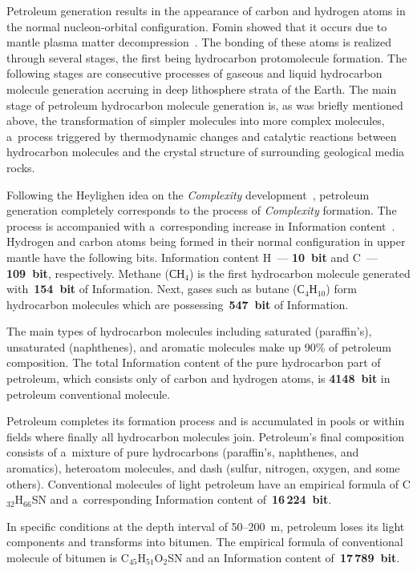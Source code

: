 \begin{multicols}{2}
Petroleum generation results in the appearance of carbon and hydrogen atoms in the normal 
nucleon-orbital configuration. Fomin showed that it occurs due to mantle plasma matter 
decompression~\cite{21-sel}. The bonding of these atoms is realized through several stages, the first 
being hydrocarbon protomolecule formation. The following stages are consecutive processes of 
gaseous and liquid hydrocarbon molecule generation accruing in deep lithosphere strata of the 
Earth. The main stage of petroleum hydrocarbon molecule generation is, as was briefly 
mentioned 
above, the transformation of simpler molecules into more complex molecules, a~process triggered 
by thermodynamic changes and catalytic reactions between hydrocarbon molecules and the 
crystal structure of surrounding geological media rocks. 

Following the Heylighen idea on the \textit{Complexity} development~\cite{7-sel}, petroleum generation 
completely corresponds to the process of \textit{Complexity}  formation. The process is 
accompanied with a~corresponding increase in Information content~\cite{22-sel}. Hydrogen and carbon 
atoms being formed in their normal configuration in upper mantle have the following bits. 
Information content H~--- \textbf{10~bit} and C~--- \textbf{109~bit}, 
respectively. Methane (СН$_4$) is 
the first hydrocarbon molecule generated with~\textbf{154~bit} of Information. Next, gases 
such as butane (С$_4$Н$_{10}$) form hydrocarbon molecules which are 
possessing~\textbf{547~bit} of Information.
 
The main types of hydrocarbon molecules including saturated (paraffin's), unsaturated 
(naphthenes), and aromatic molecules make up 90\% of petroleum composition. The total 
Information content of the pure hydrocarbon part of petroleum, which consists only of carbon 
and hydrogen atoms, is \textbf{4148~bit} in petroleum conventional molecule.

Petroleum completes its formation process and is accumulated in pools or within fields where 
finally all hydrocarbon molecules join. Petroleum's final composition consists of a~mixture of 
pure hydrocarbons (paraffin's, naphthenes, and aromatics), heteroatom molecules, and dash 
(sulfur, nitrogen, oxygen, and some others). Conventional molecules of light petroleum have an 
empirical formula of C$_{32}$H$_{66}$SN and a~corresponding Information content 
of~\textbf{16\,224~bit}.

In specific conditions at the depth interval of 50--200~m, petroleum loses its light components and 
transforms into bitumen. The empirical formula of conventional molecule of bitumen is 
C$_{45}$H$_{51}$O$_2$SN and an Information content of~\textbf{17\,789~bit}.


\end{multicols}
